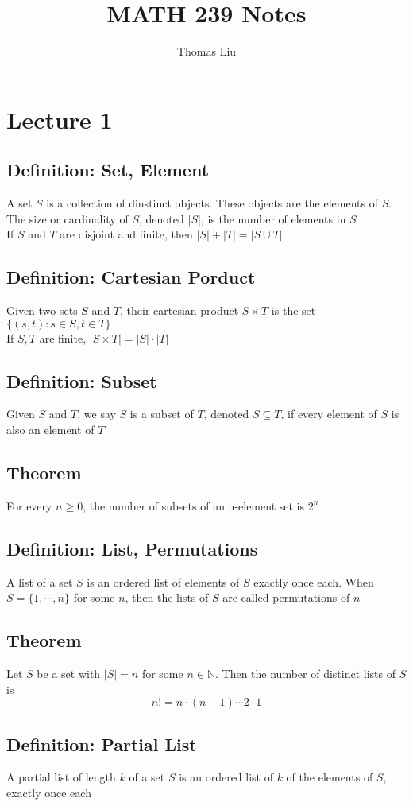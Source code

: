 \documentclass[11pt]{article}
\title{MATH 239 Notes}
\author{Thomas Liu}
\newcommand{\N}{{\mathbb{N}}}
\begin{document}
\maketitle
\tableofcontents

\newpage 

\section{Lecture 1}
\subsection{Definition: Set, Element}
A set $S$ is a collection of dinstinct objects. These objects are the elements of $S$. 
The size or cardinality of $S$, denoted $|S|$, is the number of elements in $S$ \\
If $S$ and $T$ are disjoint and finite, then $|S|+|T|=|S\cup T|$
\subsection{Definition: Cartesian Porduct}
Given two sets $S$ and $T$, their cartesian product $S\times T$ is the set $\{(s,t):s\in S, t\in T\}$ \\
If $S, T$ are finite, $|S\times T| = |S|\cdot |T|$
\subsection{Definition: Subset}
Given $S$ and $T$, we say $S$ is a subset of $T$, denoted $S\subseteq T$, if every element of $S$ is also an element of $T$
\subsection{Theorem}
For every $n\geq0$, the number of subsets of an n-element set is $2^n$
\subsection{Definition: List, Permutations}
A list of a set $S$ is an ordered list of elements of $S$ exactly once each. When $S=\{1,\cdots,n\}$ for some $n$, then the lists of $S$ are called permutations of $n$
\subsection{Theorem}
Let $S$ be a set with $|S|=n$ for some $n\in\N$. Then the number of distinct lists of $S$ is \[n!=n\cdot(n-1)\cdots2\cdot1\]
\subsection{Definition: Partial List}
A partial list of length $k$ of a set $S$ is an ordered list of $k$ of the elements of $S$, exactly once each
\end{document}
